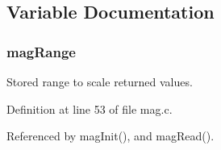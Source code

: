 \subsection{Variable Documentation}
\hypertarget{group__mag_gaae12e12b371d0bcebe05462384a519a2}{
\subsubsection[{mag\-Range}]{ mag\-Range}}\label{group__mag_gaae12e12b371d0bcebe05462384a519a2}


Stored range to scale returned values. 



Definition at line 53 of file mag.\-c.



Referenced by mag\-Init(), and mag\-Read().

